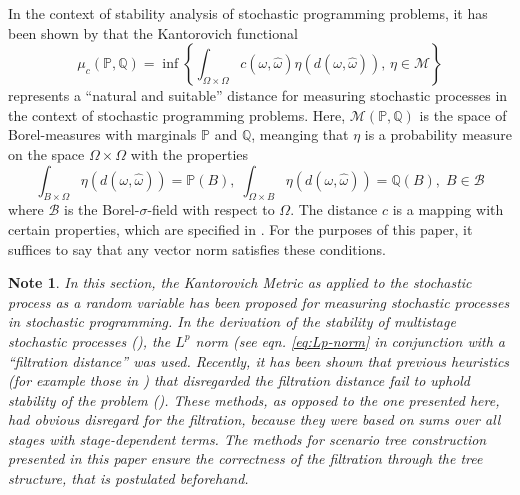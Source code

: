 \documentclass[a4paper, 12pt] {article}
\newtheorem*{Note}{Note}
\begin{document}
In the context of stability analysis of stochastic programming problems, it has been shown by \cite{Dupacova2003} that the Kantorovich functional
\begin{equation}
  \label{eq:define-infinitedim-kantorovich}
  \mu_c(\mathbb{P}, \mathbb{Q}) = \inf\left\{\int_{\Omega\times\Omega}c(\omega, \hat{\omega})\eta(d(\omega,\hat{\omega})),\, \eta\in\mathcal{M}\right\}
\end{equation}
represents a  ``natural and suitable''\cite{Dupacova2003} distance for measuring stochastic processes in the context of stochastic programming problems. 
Here, $\mathcal{M}(\mathbb{P, Q})$ is the space of Borel-measures with marginals $\mathbb{P}$ and $\mathbb{Q}$, meanging that $\eta$ is a probability measure on the space $\Omega\times\Omega$ with the properties
\begin{equation}
  \label{eq:define-borel-measures}
  \int_{B\times \Omega} \eta(d(\omega,\hat{\omega})) = \mathbb{P}(B),\;   \int_{\Omega\times B} \eta(d(\omega,\hat{\omega})) = \mathbb{Q}(B),\; B \in \mathcal{B}
\end{equation}
where $\mathcal{B}$ is the Borel-$\sigma$-field with respect to $\Omega$.
The distance $c$ is a mapping with certain properties, which are specified in \cite{Dupacova2003}.
For the purposes of this paper, it suffices to say that any vector norm satisfies these conditions.

\begin{Note}
In this section, the Kantorovich Metric as applied to the stochastic process as a random variable has been proposed for measuring stochastic processes in stochastic programming.
In the derivation of the stability of multistage stochastic processes (\cite{Heitsch2010}), the $L^p$ norm (see eqn. \ref{eq:Lp-norm} in conjunction with a ``filtration distance'' was used.
Recently, it has been shown that previous heuristics (for example those in \cite{Dupacova2003}) that disregarded the filtration distance fail to uphold stability of the problem (\cite{Heitsch2009a}).
These methods, as opposed to the one presented here, had obvious disregard for the filtration, because they were based on sums over all stages with stage-dependent terms.
The methods for scenario tree construction presented in this paper ensure the correctness of the filtration through the tree structure, that is postulated beforehand.
\end{Note}
\end{document}
